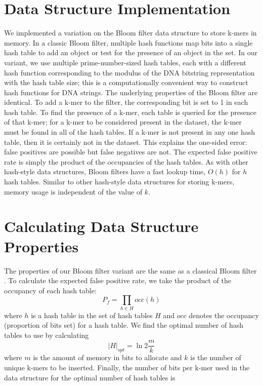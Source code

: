 \documentclass{pnastwo}
\begin{document}
\begin{article}
\begin{materials}
\section{Data Structure Implementation}
We implemented a variation on the Bloom filter data structure to store
k-mers in memory. In a classic Bloom filter, multiple hash functions
map bits into a single hash table to add an object or test for the presence
of an object in the set. In our variant, we use multiple
prime-number-sized hash tables, each with a different hash
function corresponding to the modulus of the DNA bitstring
representation with the hash table size; this is a computationally convenient way to construct hash functions for DNA strings.  The underlying properties of
the Bloom filter are identical.  To add a k-mer to the
filter, the corresponding bit is set to 1 in each hash table.  To find
the presence of a k-mer, each table is queried for the presence of
that k-mer; for a k-mer to be considered present in the dataset, the
k-mer must be found in all of the hash tables.  If a k-mer is not
present in any one hash table, then it is certainly not in the
dataset. This explains the one-sided error: false positives are
possible but false negatives are not. The expected false positive rate
is simply the product of the occupancies of the hash tables.  As with
other hash-style data structures, Bloom filters have a fast lookup
time, $O(h)$ for $h$ hash tables.  Similar to other hash-style data
structures for storing k-mers, memory usage is independent of the
value of $k$.

\section{Calculating Data Structure Properties}
The properties of our Bloom filter variant are the
same as a classical Bloom filter \cite{bloomsurvey}.
To calculate the expected false positive 
rate, we
take the product of the occupancy of each hash table:
\begin{displaymath}
P_f = \prod_{h \in H} occ(h)
\end{displaymath}
where $h$ is a hash table in the set of hash tables $H$ and $occ$ denotes
the occupancy (proportion of bits set) for a hash table.
We find the optimal number of hash tables
to use by calculating
\begin{displaymath}
\vert H \vert_{opt} = \ln 2 \frac{m}{k}
\end{displaymath}
where $m$ is the amount of memory in bits to allocate and $k$
is the number of unique k-mers to be inserted. Finally,
the number of bits per
k-mer used in the data structure for the optimal number of hash 
tables is


\end{materials}
\end{article}
\end{document}
